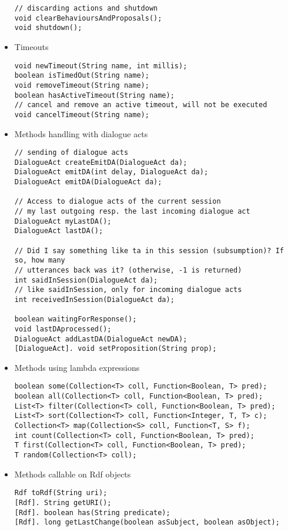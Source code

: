 \begin{itemize}
\begin{small}
\begin{lstlisting}
// discarding actions and shutdown
void clearBehavioursAndProposals();
void shutdown();
\end{lstlisting}
\end{small}

\item Timeouts
\begin{small}
\begin{lstlisting}
void newTimeout(String name, int millis);
boolean isTimedOut(String name);
void removeTimeout(String name);
boolean hasActiveTimeout(String name);
// cancel and remove an active timeout, will not be executed
void cancelTimeout(String name);
\end{lstlisting}
\end{small}

\item Methods handling with dialogue acts
\begin{small}
\begin{lstlisting}
// sending of dialogue acts
DialogueAct createEmitDA(DialogueAct da);
DialogueAct emitDA(int delay, DialogueAct da);
DialogueAct emitDA(DialogueAct da);

// Access to dialogue acts of the current session
// my last outgoing resp. the last incoming dialogue act
DialogueAct myLastDA();
DialogueAct lastDA();

// Did I say something like ta in this session (subsumption)? If so, how many
// utterances back was it? (otherwise, -1 is returned)
int saidInSession(DialogueAct da);
// like saidInSession, only for incoming dialogue acts
int receivedInSession(DialogueAct da);

boolean waitingForResponse();
void lastDAprocessed();
DialogueAct addLastDA(DialogueAct newDA);
[DialogueAct]. void setProposition(String prop);
\end{lstlisting}
\end{small}

\item Methods using lambda expressions
\begin{small}
\begin{lstlisting}
boolean some(Collection<T> coll, Function<Boolean, T> pred);
boolean all(Collection<T> coll, Function<Boolean, T> pred);
List<T> filter(Collection<T> coll, Function<Boolean, T> pred);
List<T> sort(Collection<T> coll, Function<Integer, T, T> c);
Collection<T> map(Collection<S> coll, Function<T, S> f);
int count(Collection<T> coll, Function<Boolean, T> pred);
T first(Collection<T> coll, Function<Boolean, T> pred);
T random(Collection<T> coll);
\end{lstlisting}
\end{small}

\item Methods callable on Rdf objects
\begin{small}
\begin{lstlisting}
Rdf toRdf(String uri);
[Rdf]. String getURI();
[Rdf]. boolean has(String predicate);
[Rdf]. long getLastChange(boolean asSubject, boolean asObject);
\end{lstlisting}
\end{small}

\end{itemize}

